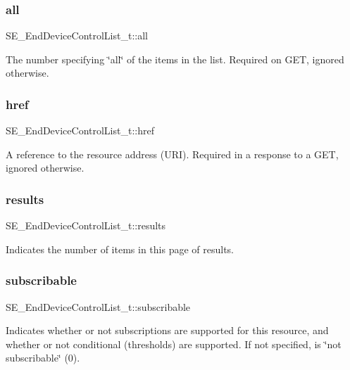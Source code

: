 \subsubsection{\texorpdfstring{all}{all}}
{\footnotesize\ttfamily S\+E\+\_\+\+End\+Device\+Control\+List\+\_\+t\+::all}

The number specifying \char`\"{}all\char`\"{} of the items in the list. Required on G\+ET, ignored otherwise. \mbox{\label{group__EndDeviceControlList_gac58496760ce23c835d784789fdd5e800}} 
\subsubsection{\texorpdfstring{href}{href}}
{\footnotesize\ttfamily S\+E\+\_\+\+End\+Device\+Control\+List\+\_\+t\+::href}

A reference to the resource address (U\+RI). Required in a response to a G\+ET, ignored otherwise. \mbox{\label{group__EndDeviceControlList_gaa08c142b0d0d594c9e10a7369d25ad6e}} 
\subsubsection{\texorpdfstring{results}{results}}
{\footnotesize\ttfamily S\+E\+\_\+\+End\+Device\+Control\+List\+\_\+t\+::results}

Indicates the number of items in this page of results. \mbox{\label{group__EndDeviceControlList_ga904fa33399c54c6019f35032add14ab7}} 
\subsubsection{\texorpdfstring{subscribable}{subscribable}}
{\footnotesize\ttfamily S\+E\+\_\+\+End\+Device\+Control\+List\+\_\+t\+::subscribable}

Indicates whether or not subscriptions are supported for this resource, and whether or not conditional (thresholds) are supported. If not specified, is \char`\"{}not subscribable\char`\"{} (0). 